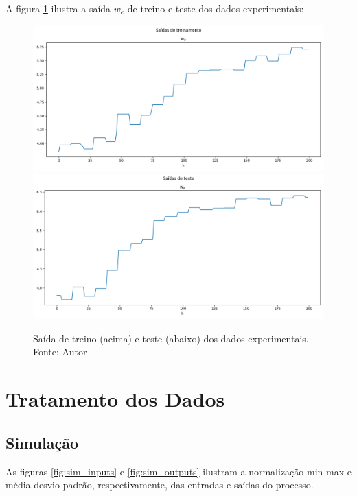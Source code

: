 A figura \ref{fig:exp_outputs_raw} ilustra a saída $w_e$ de treino e teste dos dados experimentais:
\begin{figure}[hbt!]
    \centering
    \includegraphics[width=0.8\linewidth]{Imagens/chap04/experiment_outputs_train_raw.png}
    \hfill
    \includegraphics[width=0.8\linewidth]{Imagens/chap04/experiment_outputs_test_raw.png}
    \caption{Saída de treino (acima) e teste (abaixo) dos dados experimentais. Fonte: Autor}
    \label{fig:exp_outputs_raw}
\end{figure}

\newpage
\section{Tratamento dos Dados}
\subsection{Simulação}
As figuras \ref{fig:sim_inputs} e \ref{fig:sim_outputs} ilustram a normalização min-max e média-desvio padrão, respectivamente, das entradas e saídas do processo.

